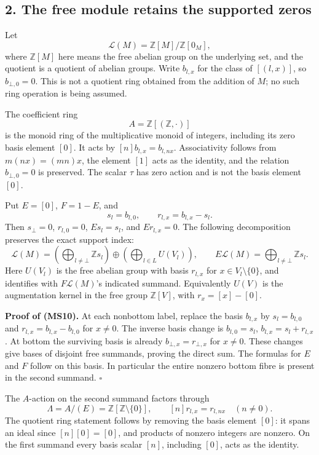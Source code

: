\documentclass[
]{article}
\begin{document}
\subsection{2. The free module retains the supported
zeros}\label{the-free-module-retains-the-supported-zeros}

Let \[
\mathscr L(M)=\mathbb Z[M]/\mathbb Z[0_M],
\tag{MS7}
\] where \(\mathbb Z[M]\) here means the free abelian group on the
underlying set, and the quotient is a quotient of abelian groups. Write
\(b_{l,x}\) for the class of \([(l,x)]\), so \(b_{\bot,0}=0\). This is
not a quotient ring obtained from the addition of \(M\); no such ring
operation is being assumed.

The coefficient ring \[
A=\mathbb Z[(\mathbb Z,\cdot)]
\tag{MS8}
\] is the monoid ring of the multiplicative monoid of integers,
including its zero basis element \([0]\). It acts by
\([n]b_{l,x}=b_{l,nx}\). Associativity follows from \(m(nx)=(mn)x\), the
element \([1]\) acts as the identity, and the relation \(b_{\bot,0}=0\)
is preserved. The scalar \(\tau\) has zero action and is not the basis
element \([0]\).

Put \(E=[0]\), \(F=1-E\), and \[
s_l=b_{l,0},\qquad r_{l,x}=b_{l,x}-s_l.
\tag{MS9}
\] Then \(s_\bot=0\), \(r_{l,0}=0\), \(Es_l=s_l\), and \(Er_{l,x}=0\).
The following decomposition preserves the exact support index: \[
\mathscr L(M)
=\left(\bigoplus_{l\ne\bot}\mathbb Zs_l\right)
\oplus
\left(\bigoplus_{l\in L}U(V_l)\right),
\qquad
E\mathscr L(M)=\bigoplus_{l\ne\bot}\mathbb Zs_l.
\tag{MS10}
\] Here \(U(V_l)\) is the free abelian group with basis \(r_{l,x}\) for
\(x\in V_l\setminus\{0\}\), and identifies with \(F\mathscr L(M)\)'s
indicated summand. Equivalently \(U(V)\) is the augmentation kernel in
the free group \(\mathbb Z[V]\), with \(r_x=[x]-[0]\).

\textbf{Proof of (MS10).} At each nonbottom label, replace the basis
\(b_{l,x}\) by \(s_l=b_{l,0}\) and \(r_{l,x}=b_{l,x}-b_{l,0}\) for
\(x\ne0\). The inverse basis change is \(b_{l,0}=s_l\),
\(b_{l,x}=s_l+r_{l,x}\). At bottom the surviving basis is already
\(b_{\bot,x}=r_{\bot,x}\) for \(x\ne0\). These changes give bases of
disjoint free summands, proving the direct sum. The formulas for \(E\)
and \(F\) follow on this basis. In particular the entire nonzero bottom
fibre is present in the second summand. \(\square\)

The \(A\)-action on the second summand factors through \[
\Lambda=A/(E)=\mathbb Z[\mathbb Z\setminus\{0\}],
\qquad [n]r_{l,x}=r_{l,nx}\quad(n\ne0).
\tag{MS11}
\] The quotient ring statement follows by removing the basis element
\([0]\): it spans an ideal since \([n][0]=[0]\), and products of nonzero
integers are nonzero. On the first summand every basis scalar \([n]\),
including \([0]\), acts as the identity.
\end{document}
